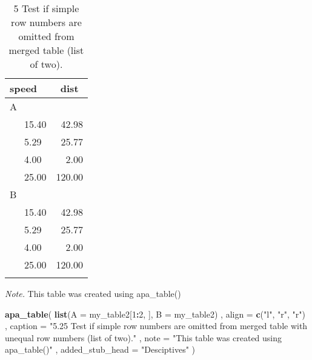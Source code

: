 \documentclass[english,man]{apa6}
\newenvironment{Shaded}{\begin{snugshade}}{\end{snugshade}}
\newcommand{\DataTypeTok}[1]{\textcolor[rgb]{0.13,0.29,0.53}{#1}}
\newcommand{\DecValTok}[1]{\textcolor[rgb]{0.00,0.00,0.81}{#1}}
\newcommand{\KeywordTok}[1]{\textcolor[rgb]{0.13,0.29,0.53}{\textbf{#1}}}
\newcommand{\NormalTok}[1]{#1}
\newcommand{\OperatorTok}[1]{\textcolor[rgb]{0.81,0.36,0.00}{\textbf{#1}}}
\newcommand{\StringTok}[1]{\textcolor[rgb]{0.31,0.60,0.02}{#1}}
\begin{document}
\begin{table}[tbp]

\begin{center}
\begin{threeparttable}

\caption{\label{tab:unnamed-chunk-9}5 Test if simple row numbers are omitted from merged table (list of two).}

\begin{tabular}{lr}
\toprule
speed & \multicolumn{1}{c}{dist}\\
\midrule
A & \\
\ \ \ 15.40 & 42.98\\
\ \ \ 5.29 & 25.77\\
\ \ \ 4.00 & 2.00\\
\ \ \ 25.00 & 120.00\\
B & \\
\ \ \ 15.40 & 42.98\\
\ \ \ 5.29 & 25.77\\
\ \ \ 4.00 & 2.00\\
\ \ \ 25.00 & 120.00\\
\bottomrule
\addlinespace
\end{tabular}

\begin{tablenotes}[para]
\normalsize{\textit{Note.} This table was created using apa\_table()}
\end{tablenotes}

\end{threeparttable}
\end{center}

\end{table}

\begin{Shaded}
\begin{Highlighting}[]
\KeywordTok{apa_table}\NormalTok{(}
  \KeywordTok{list}\NormalTok{(}\DataTypeTok{A =}\NormalTok{ my_table2[}\DecValTok{1}\OperatorTok{:}\DecValTok{2}\NormalTok{, ], }\DataTypeTok{B =}\NormalTok{ my_table2)}
\NormalTok{  , }\DataTypeTok{align =} \KeywordTok{c}\NormalTok{(}\StringTok{"l"}\NormalTok{, }\StringTok{"r"}\NormalTok{, }\StringTok{"r"}\NormalTok{)}
\NormalTok{  , }\DataTypeTok{caption =} \StringTok{"5.25 Test if simple row numbers are omitted from merged table with unequal row numbers (list of two)."}
\NormalTok{  , }\DataTypeTok{note =} \StringTok{"This table was created using apa_table()"}
\NormalTok{  , }\DataTypeTok{added_stub_head =} \StringTok{"Desciptives"}
\NormalTok{)}
\end{Highlighting}
\end{Shaded}
\end{document}
